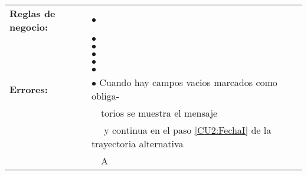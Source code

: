 \begin{tabular}{|l|l|}
	\textbf{Reglas de negocio:}&$\bullet$ \RNref{RN6}{Formato de fecha}\\
	&$\bullet$ \RNref{RN7}{Perido preestablecido}\\
	&$\bullet$ \RNref{RN8}{Periodo válido}\\
	&$\bullet$ \RNref{RN9}{Límite de periodo}\\
	&$\bullet$ \RNref{RN10}{Campos obligatorios}\\
	&$\bullet$ \RNref{RN12}{Orden de publicación}\\
	\hline

	\textbf{Errores:} &$\bullet$\TError{CU2}{Uno} Cuando hay campos vacios marcados como obliga-\\
	&\ \ torios se muestra el mensaje \Tref{MSG3}{MSG3 Faltan campos obliga-}\\
	&\ \ \Tref{MSG3}{torios} y continua en el paso \ref{CU2:FechaI} de la trayectoria alternativa\\
	&\ \  A\\
	\hline
\end{tabular}\\\\

